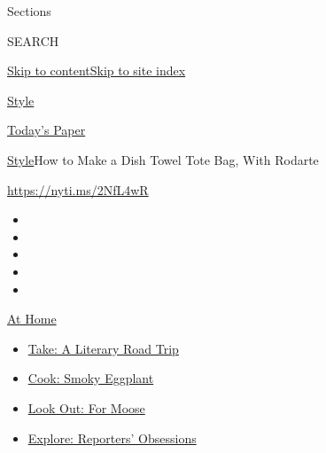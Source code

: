 Sections

SEARCH

\protect\hyperlink{site-content}{Skip to
content}\protect\hyperlink{site-index}{Skip to site index}

\href{https://www.nytimes3xbfgragh.onion/section/style}{Style}

\href{https://myaccount.nytimes3xbfgragh.onion/auth/login?response_type=cookie\&client_id=vi}{}

\href{https://www.nytimes3xbfgragh.onion/section/todayspaper}{Today's
Paper}

\href{/section/style}{Style}\textbar{}How to Make a Dish Towel Tote Bag,
With Rodarte

\url{https://nyti.ms/2NfL4wR}

\begin{itemize}
\item
\item
\item
\item
\item
\end{itemize}

\href{https://www.nytimes3xbfgragh.onion/spotlight/at-home?action=click\&pgtype=Article\&state=default\&region=TOP_BANNER\&context=at_home_menu}{At
Home}

\begin{itemize}
\tightlist
\item
  \href{https://www.nytimes3xbfgragh.onion/2020/07/28/books/time-for-a-literary-road-trip.html?action=click\&pgtype=Article\&state=default\&region=TOP_BANNER\&context=at_home_menu}{Take:
  A Literary Road Trip}
\item
  \href{https://www.nytimes3xbfgragh.onion/2020/07/29/magazine/bored-with-your-home-cooking-some-smoky-eggplant-will-fix-that.html?action=click\&pgtype=Article\&state=default\&region=TOP_BANNER\&context=at_home_menu}{Cook:
  Smoky Eggplant}
\item
  \href{https://www.nytimes3xbfgragh.onion/2020/07/27/travel/moose-michigan-isle-royale.html?action=click\&pgtype=Article\&state=default\&region=TOP_BANNER\&context=at_home_menu}{Look
  Out: For Moose}
\item
  \href{https://www.nytimes3xbfgragh.onion/interactive/2020/at-home/even-more-reporters-editors-diaries-lists-recommendations.html?action=click\&pgtype=Article\&state=default\&region=TOP_BANNER\&context=at_home_menu}{Explore:
  Reporters' Obsessions}
\end{itemize}

